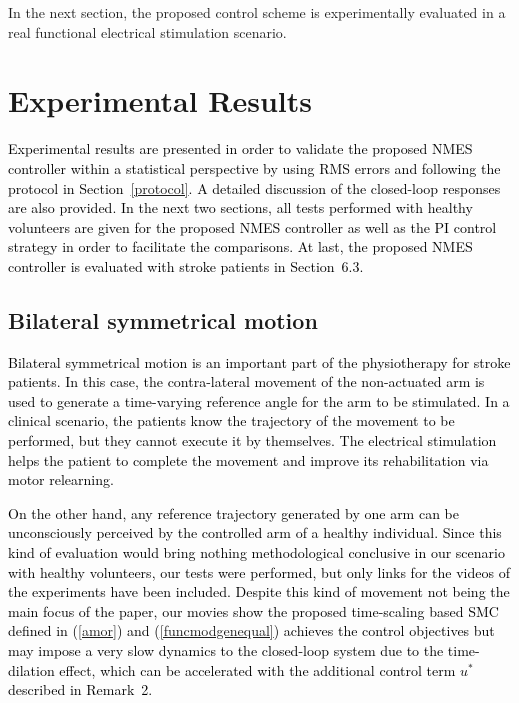 \documentclass[review]{elsarticle}
\begin{document}
In the next section, the proposed control scheme is experimentally evaluated in a real functional electrical stimulation scenario.
%



\section{Experimental Results}



\textcolor{black}{Experimental results are presented in order to validate the proposed NMES controller within a statistical perspective by using RMS errors and following the protocol in Section~\ref{protocol}. A detailed discussion of the closed-loop responses are also provided.} \textcolor{black}{In the next two sections, all tests performed with healthy volunteers are given for the proposed NMES controller as well as the PI control strategy in order to facilitate the comparisons. At last, the proposed NMES controller is evaluated with stroke patients in Section~6.3.}



\subsection{Bilateral symmetrical motion}

\textcolor{black}{Bilateral symmetrical motion \cite{SFYLS:2012} is an important part of the physiotherapy for stroke patients.
In this case, the contra-lateral movement of the non-actuated arm is used to generate a time-varying reference angle for the arm to be stimulated. In a clinical scenario, the patients know the trajectory of the movement to be performed, but they cannot execute it by themselves. The electrical stimulation helps the patient to complete the movement and improve its rehabilitation via motor relearning.} 

\textcolor{black}{On the other hand, any reference trajectory generated by one arm can be unconsciously perceived by the controlled arm of a healthy individual. Since this kind of evaluation would bring nothing methodological conclusive in our scenario with healthy volunteers, our tests were performed, but only links for the videos of the experiments have been included. Despite this kind of movement \textcolor{black}{not being} the main focus of the paper, our movies show the proposed time-scaling based SMC defined in (\ref{amor}) and (\ref{funcmodgenequal}) achieves the control objectives but may impose a very slow dynamics to the closed-loop system due to the time-dilation effect, which can be accelerated with the additional control term $u^*$ described in Remark~2.}
\end{document}
